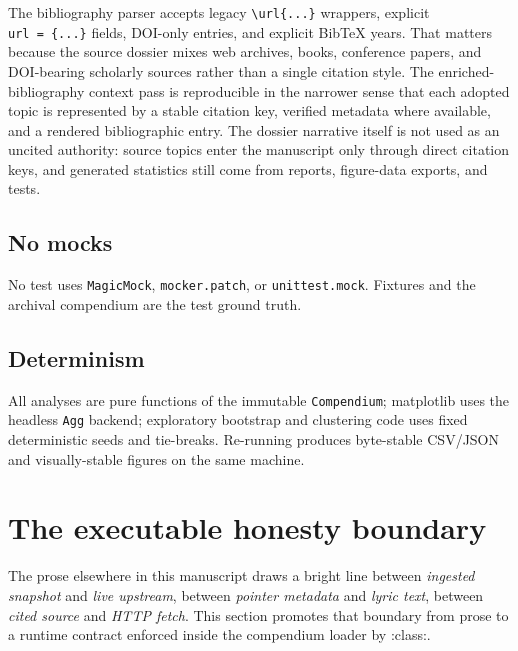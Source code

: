 \documentclass[
]{article}
\begin{document}
The bibliography parser accepts legacy
\texttt{\textbackslash{}url\{...\}} wrappers, explicit
\texttt{url\ =\ \{...\}} fields, DOI-only entries, and explicit BibTeX
years. That matters because the source dossier mixes web archives,
books, conference papers, and DOI-bearing scholarly sources rather than
a single citation style. The enriched-bibliography context pass is
reproducible in the narrower sense that each adopted topic is
represented by a stable citation key, verified metadata where available,
and a rendered bibliographic entry. The dossier narrative itself is not
used as an uncited authority: source topics enter the manuscript only
through direct citation keys, and generated statistics still come from
reports, figure-data exports, and tests.

\subsection{No mocks}\label{no-mocks}

No test uses \texttt{MagicMock}, \texttt{mocker.patch}, or
\texttt{unittest.mock}. Fixtures and the archival compendium are the
test ground truth.

\subsection{Determinism}\label{determinism}

All analyses are pure functions of the immutable \texttt{Compendium};
matplotlib uses the headless \texttt{Agg} backend; exploratory bootstrap
and clustering code uses fixed deterministic seeds and tie-breaks.
Re-running  produces
byte-stable CSV/JSON and visually-stable figures on the same machine.

\newpage

\section{The executable honesty
boundary}\label{the-executable-honesty-boundary}

The prose elsewhere in this manuscript draws a bright line between
\emph{ingested snapshot} and \emph{live upstream}, between \emph{pointer
metadata} and \emph{lyric text}, between \emph{cited source} and
\emph{HTTP fetch}. This section promotes that boundary from prose to a
runtime contract enforced inside the compendium loader by
:class:.
\end{document}
